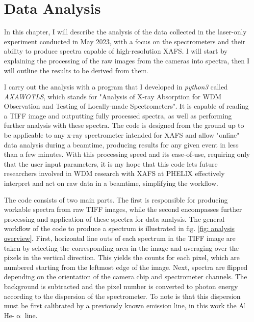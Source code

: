 \chapter{Data Analysis}
\label{chapter: data analysis}

In this chapter, I will describe the analysis of the data collected in the laser-only experiment conducted in May 2023, with a focus on the spectrometers and their ability to produce spectra capable of high-resolution XAFS. I will start by explaining the processing of the raw images from the cameras into spectra, then I will outline the results to be derived from them. 

I carry out the analysis with a program that I developed in 
\textit{python3} called \textit{AXAWOTLS}, which stands for "Analysis of X-ray Absorption for WDM Observation and Testing of Locally-made Spectrometers". It is capable of reading a 
TIFF image and outputting fully processed spectra, as well as performing further analysis with these spectra. The code is designed from the 
ground up to be applicable to any x-ray spectrometer intended for XAFS and allow "online" data analysis 
during a beamtime, producing results for any given event in less than a few 
minutes. With this processing speed and its ease-of-use, requiring only that the user input parameters, it is my hope that this code lets future researchers involved in WDM 
research with XAFS at PHELIX effectively interpret and act on raw data in a 
beamtime, simplifying the workflow. 

The code consists of two main parts. The first is responsible for producing 
workable spectra from raw TIFF images, while the second encompasses further processing and application of these spectra for 
data analysis.
The general workflow of the code to produce a spectrum is illustrated 
in fig. \ref{fig: analysis overview}. First, horizontal line outs of each 
spectrum in the TIFF image are taken by selecting the corresponding area in the 
image and averaging over the pixels in the vertical direction. This yields the 
counts for each pixel, which are numbered starting from the leftmost edge of 
the image. Next, spectra are flipped depending on the orientation of the camera 
chip and spectrometer channels. The background is subtracted and the 
pixel number is converted to photon energy according to the dispersion of the 
spectrometer. To note is that this dispersion must be first calibrated by a 
previously known emission line, in this work the Al He-$\upalpha$ line.

